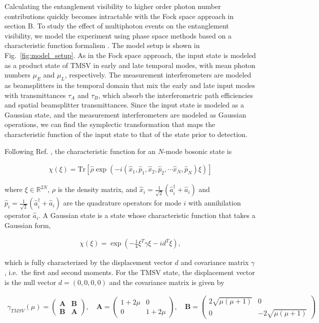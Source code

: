 \documentclass[11pt]{caltech_thesis} %
\begin{document}
Calculating the entanglement visibility to higher order photon number contributions quickly becomes intractable with the Fock space approach in section B. To study the effect of multiphoton events on the entanglement visibility, we model the experiment using phase space methods based on a characteristic function formalism \autocite{Davis2022,takeoka2015full}. The model setup is shown in Fig.~\ref{fig:model_setup}. As in the Fock space approach, the input state is modeled as a product state of TMSV in early and late temporal modes, with mean photon numbers $\mu_E$ and $\mu_L$, respectively. The measurement interferometers are modeled as beamsplitters in the temporal domain that mix the early and late input modes with transmittances $\tau_A$ and $\tau_B$, which absorb the interferometric path efficiencies and spatial beamsplitter transmittances. Since the input state is modeled as a Gaussian state, and the measurement interferometers are modeled as Gaussian operations, we can find the symplectic transformation that maps the characteristic function of the input state to that of the state prior to detection.

Following Ref. \autocite{Davis2022}, the characteristic function for an $N$-mode bosonic state is

\begin{align}
    \chi(\xi)=\text{Tr}\left[\hat{\rho}\exp(-i(\hat{x}_1,\hat{p}_1,\hat{x}_2,\hat{p}_2,\cdots\hat{x}_N,\hat{p}_N) \xi)\right]
\end{align}

where $\xi\in \mathbb{R}^{2N}$, $\rho$ is the density matrix, and $\hat{x}_i = \frac{1}{\sqrt{2}}(\hat{a}_i^\dagger+\hat{a}_i)$ and $\hat{p}_i=\frac{1}{\sqrt{2}}(\hat{a}_i^\dagger+\hat{a}_i)$ are the quadrature operators for mode $i$ with annihilation operator $\hat{a}_i$.
A Gaussian state is a state whose characteristic function that takes a Gaussian form,

\begin{align}
    \chi(\xi) = \exp(-\frac{1}{4}\xi^T\gamma \xi - id^T \xi),
\end{align}

which is fully characterized by the displacement vector $d$ and covariance matrix $\gamma$, i.e.~the first and second moments.
For the TMSV state, the displacement vector is the null vector $d =(0,0,0,0)$ and the covariance matrix is given by

\begin{align}
    \gamma_{TMSV}(\mu) = 
    \begin{pmatrix}
    \mathbf{A}&\mathbf{B}\\
    \mathbf{B}&\mathbf{A}
    \end{pmatrix}, \quad
    \mathbf{A}=
    \begin{pmatrix}
        1+2\mu&0\\
        0&1+2\mu
    \end{pmatrix}, \quad
    \mathbf{B}=\begin{pmatrix}
        2\sqrt{\mu(\mu+1)}&0\\
        0&-2\sqrt{\mu(\mu+1)}
    \end{pmatrix}
\end{align}
\end{document}

